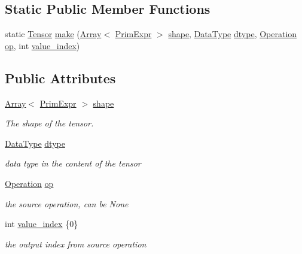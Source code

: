 \subsection*{Static Public Member Functions}
\begin{DoxyCompactItemize}
\item 
static \hyperlink{classtvm_1_1te_1_1Tensor}{Tensor} \hyperlink{classtvm_1_1te_1_1TensorNode_a4c08ea01c5a78a1a83e2745368ae19a2}{make} (\hyperlink{classtvm_1_1Array}{Array}$<$ \hyperlink{classtvm_1_1PrimExpr}{Prim\+Expr} $>$ \hyperlink{classtvm_1_1te_1_1TensorNode_a0ba732bc2def0d467854585752911351}{shape}, \hyperlink{namespacetvm_a41918af1a1dc386388639a9d3ad06c5d}{Data\+Type} \hyperlink{classtvm_1_1te_1_1TensorNode_a4c0b6e32a09ab6ea6b869de45394294d}{dtype}, \hyperlink{classtvm_1_1te_1_1Operation}{Operation} \hyperlink{classtvm_1_1te_1_1TensorNode_a64faab73896ac7e9dd8dc43110920c7c}{op}, int \hyperlink{classtvm_1_1te_1_1TensorNode_aaf908a208cea7f27477c1c58ba605aa8}{value\+\_\+index})
\end{DoxyCompactItemize}
\subsection*{Public Attributes}
\begin{DoxyCompactItemize}
\item 
\hyperlink{classtvm_1_1Array}{Array}$<$ \hyperlink{classtvm_1_1PrimExpr}{Prim\+Expr} $>$ \hyperlink{classtvm_1_1te_1_1TensorNode_a0ba732bc2def0d467854585752911351}{shape}
\begin{DoxyCompactList}\small\item\em The shape of the tensor. \end{DoxyCompactList}\item 
\hyperlink{namespacetvm_a41918af1a1dc386388639a9d3ad06c5d}{Data\+Type} \hyperlink{classtvm_1_1te_1_1TensorNode_a4c0b6e32a09ab6ea6b869de45394294d}{dtype}
\begin{DoxyCompactList}\small\item\em data type in the content of the tensor \end{DoxyCompactList}\item 
\hyperlink{classtvm_1_1te_1_1Operation}{Operation} \hyperlink{classtvm_1_1te_1_1TensorNode_a64faab73896ac7e9dd8dc43110920c7c}{op}
\begin{DoxyCompactList}\small\item\em the source operation, can be None \end{DoxyCompactList}\item 
int \hyperlink{classtvm_1_1te_1_1TensorNode_aaf908a208cea7f27477c1c58ba605aa8}{value\+\_\+index} \{0\}
\begin{DoxyCompactList}\small\item\em the output index from source operation \end{DoxyCompactList}\end{DoxyCompactItemize}
